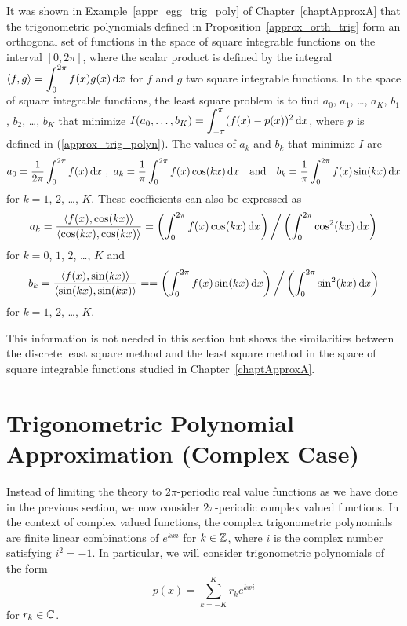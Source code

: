 \begin{rmk}
It was shown in Example~\ref{appr_egg_trig_poly} of
Chapter~\ref{chaptApproxA} that the trigonometric polynomials defined in
Proposition~\ref{approx_orth_trig} form an orthogonal set of functions
in the space of square integrable functions on the interval
$[0,2\pi]$, where the scalar product is defined by the integral
$\displaystyle \left\langle{f} , {g}\right\rangle = \int_0^{2\pi} f(x)g(x) \,\mathrm{d}x$ for $f$ and $g$
two square integrable functions.  In the space of square integrable
functions, the least square problem is to find $a_0$, $a_1$, \ldots, $a_K$,
$b_1$, $b_2$, \ldots, $b_K$ that minimize
$\displaystyle I(a_0, \ldots, b_K) = \int_{-\pi}^\pi (f(x)-p(x))^2 \,\mathrm{d}x$,
where $p$ is defined in (\ref{approx_trig_polyn}).  The values of $a_k$
and $b_k$ that minimize $I$ are
\[
a_0 = \frac{1}{2\pi} \int_0^{2\pi} f(x) \,\mathrm{d}x \ ,
\ a_k = \frac{1}{\pi} \int_0^{2\pi} f(x) \cos(kx)\,\mathrm{d}x
\quad \text{and} \quad
b_k = \frac{1}{\pi} \int_0^{2\pi} f(x) \sin(kx)\,\mathrm{d}x
\]
for $k=1$, $2$, \ldots, $K$.  These coefficients can also be expressed as
\[
a_k = \frac{\left\langle{f(x)} , {\cos(k x)}\right\rangle}{\left\langle{\cos(k x)} , {\cos(k x)}\right\rangle}
= \left(\int_0^{2\pi} f(x)\cos(k x) \,\mathrm{d}x \right) \bigg/
\left( \int_0^{2\pi} \cos^2(kx) \,\mathrm{d}x \right)
\]
for $k=0$, $1$, $2$, \ldots, $K$ and 
\[
b_k = \frac{\left\langle{f(x)} , {\sin(k x)}\right\rangle}{\left\langle{\sin(k x)} , {\sin(k x)}\right\rangle} =
= \left( \int_0^{2\pi} f(x)\sin(k x) \,\mathrm{d}x \right) \bigg/
\left( \int_0^{2\pi} \sin^2(kx) \,\mathrm{d}x \right)
\]
for $k=1$, $2$, \ldots, $K$.

This information is not needed in this section but shows the similarities
between the discrete least square method and the least square method in the
space of square integrable functions studied in Chapter~\ref{chaptApproxA}.
\label{approx_appr_related}
\end{rmk}

\section{Trigonometric Polynomial Approximation (Complex Case)}

Instead of limiting the theory to $2\pi$-periodic real value functions as we
have done in the previous section, we now consider $2\pi$-periodic complex
valued functions.  In the context of complex valued functions, the complex
trigonometric polynomials are finite linear combinations of
$\displaystyle e^{k x i}$ for $k\in \mathbb{Z}$, where $i$ is the complex number
satisfying $i^2=-1$.  In particular, we will consider trigonometric
polynomials of the form
\begin{equation}\label{approx_complex_polyn}
p(x) = \sum_{k=-K}^K r_k e^{k x i}
\end{equation}
for $r_k \in \mathbb{C}$.


